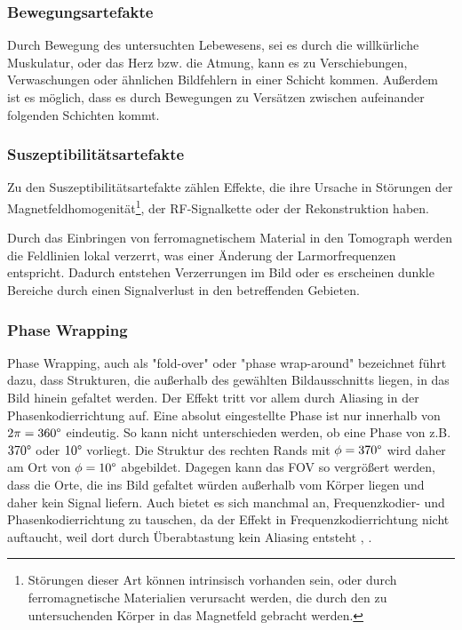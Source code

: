\subsubsection{Bewegungsartefakte}
Durch Bewegung des untersuchten Lebewesens, sei es durch die willkürliche Muskulatur, oder das Herz bzw. die Atmung, kann es zu Verschiebungen, Verwaschungen oder ähnlichen Bildfehlern in einer Schicht kommen. Außerdem ist es möglich, dass es durch Bewegungen zu Versätzen zwischen aufeinander folgenden Schichten kommt.                       

\subsubsection{Suszeptibilitätsartefakte}
Zu den Suszeptibilitätsartefakte zählen Effekte, die ihre Ursache in Störungen der Magnetfeldhomogenität\footnote{Störungen dieser Art können intrinsisch vorhanden sein, oder durch ferromagnetische Materialien verursacht werden, die durch den zu untersuchenden Körper in das Magnetfeld gebracht werden.}, der RF-Signalkette oder der Rekonstruktion haben.

Durch das Einbringen von ferromagnetischem Material in den Tomograph werden die Feldlinien lokal verzerrt, was einer Änderung der Larmorfrequenzen entspricht. Dadurch entstehen Verzerrungen im Bild oder es erscheinen dunkle Bereiche durch einen Signalverlust in den betreffenden Gebieten.

\subsubsection{Phase Wrapping}
Phase Wrapping, auch als "fold-over" oder "phase wrap-around" bezeichnet führt dazu, dass Strukturen, die außerhalb des gewählten Bildausschnitts liegen, in das Bild hinein gefaltet werden. Der Effekt tritt vor allem durch Aliasing in der Phasenkodierrichtung auf. Eine absolut eingestellte Phase ist nur innerhalb von $2\pi=360\degree$ eindeutig. So kann nicht unterschieden werden, ob eine Phase von z.B. $370\degree$ oder $10\degree$ vorliegt. Die Struktur des rechten Rands mit $\phi=370\degree$ wird daher am Ort von $\phi=10\degree$ abgebildet. Dagegen kann das FOV so vergrößert werden, dass die Orte, die ins Bild gefaltet würden außerhalb vom Körper liegen und daher kein Signal liefern. Auch bietet es sich manchmal an, Frequenzkodier- und Phasenkodierrichtung zu tauschen, da der Effekt in Frequenzkodierrichtung nicht auftaucht, weil dort durch Überabtastung kein Aliasing entsteht \cite{Pusey1988}, \cite{Heiland2008}.

